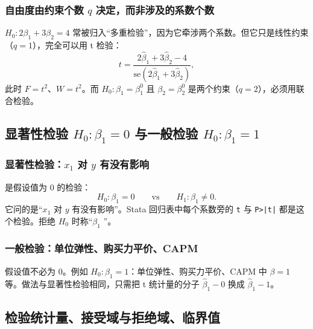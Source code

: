 \subsubsection{自由度由约束个数 \texorpdfstring{$q$}{q} 决定，而非涉及的系数个数}

\begin{note}
$H_0:2\beta_1+3\beta_2=4$ 常被归入“多重检验”，因为它牵涉两个系数。但它只是线性约束（$q=1$），完全可以用 t 检验：
\[
t=\frac{2\hat\beta_1+3\hat\beta_2-4}{\mathrm{se}(2\hat\beta_1+3\hat\beta_2)},
\]
此时 $F=t^2$、$W=t^2$。而 $H_0:\beta_1=\beta_1^0$ 且 $\beta_2=\beta_2^0$ 是两个约束（$q=2$），必须用联合检验。
\end{note}

\subsection{显著性检验 \texorpdfstring{$H_0:\beta_1=0$}{H0: beta1 = 0} 与一般检验 \texorpdfstring{$H_0:\beta_1=1$}{H0: beta1 = 1}}

\subsubsection{显著性检验：\texorpdfstring{$x_1$}{x1} 对 \texorpdfstring{$y$}{y} 有没有影响}

是假设值为 0 的检验：
\[
H_0:\beta_1=0\qquad\text{vs}\qquad H_1:\beta_1\ne0 .
\]
它问的是“$x_1$ 对 $y$ 有没有影响”。Stata 回归表中每个系数旁的 \texttt{t} 与 \texttt{P>|t|} 都是这个检验。拒绝 $H_0$ 时称“$\beta_1$ ”。

\subsubsection{一般检验：单位弹性、购买力平价、CAPM}

假设值不必为 0。例如 $H_0:\beta_1=1$：单位弹性、购买力平价、CAPM 中 $\beta=1$ 等。做法与显著性检验相同，只需把 t 统计量的分子 $\hat\beta_1-0$ 换成 $\hat\beta_1-1$。

\subsection{检验统计量、接受域与拒绝域、临界值}

